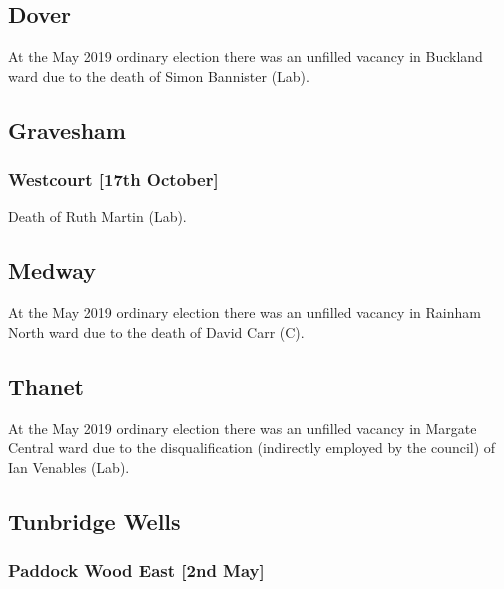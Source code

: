 \documentclass[a4paper,openany]{book}
\begin{document}
\begin{resultsiii}
\subsection*{Dover}

At the May 2019 ordinary election there was an unfilled vacancy in Buckland ward due to the death of Simon Bannister (Lab).

\subsection*{Gravesham}

\subsubsection*{Westcourt \hspace*{\fill}\nolinebreak[1]%
	\enspace\hspace*{\fill}
	[17th October]}


Death of Ruth Martin (Lab).

\subsection*{Medway}

At the May 2019 ordinary election there was an unfilled vacancy in Rainham North ward due to the death of David Carr (C).

\subsection*{Thanet}

At the May 2019 ordinary election there was an unfilled vacancy in Margate Central ward due to the disqualification (indirectly employed by the council) of Ian Venables (Lab).

\subsection*{Tunbridge Wells}

\subsubsection*{Paddock Wood East \hspace*{\fill}\nolinebreak[1]%
	\enspace\hspace*{\fill}
	[2nd May]}


\end{resultsiii}
\end{document}
